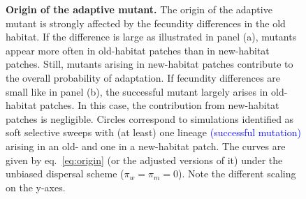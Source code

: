 \documentclass[a4paper,11pt]{article}
\newcommand{\francois}[1]{\textcolor{blue}{(#1)}}
\begin{document}
\begin{figure}[t!]
	\caption{\textbf{Origin of the adaptive mutant.} \small The origin of the adaptive mutant is strongly affected by the fecundity differences in the old habitat. If the difference is large as illustrated in panel (a), mutants appear more often in old-habitat patches than in new-habitat patches. Still, mutants arising in new-habitat patches contribute to the overall probability of adaptation. If fecundity differences are small like in panel (b), the successful mutant largely arises in old-habitat patches. In this case, the contribution from new-habitat patches is negligible. Circles correspond to simulations identified as soft selective sweeps with (at least) one lineage \francois{successful mutation} arising in an old- and one in a new-habitat patch. The curves are given by eq.~\eqref{eq:origin} (or the adjusted versions of it) under the unbiased dispersal scheme ($\pi_w=\pi_m=0$). Note the different scaling on the y-axes.}
	\label{fig:origin}
\end{figure}

\end{document}
